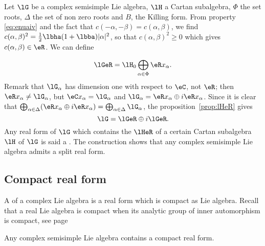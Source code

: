Let $\lG$ be a complex semisimple Lie algebra, $\lH$ a Cartan subalgebra, $\Phi$ the set roots, $\Delta$ the set of non zero roots and $B$, the Killing form. From property \eqref{eq:enuaiv} and the fact that $c(-\alpha,-\beta)=c(\alpha,\beta)$, we find $c(\alpha,\beta)^2=\frac{1}{2}\lbha(1+\lbba)|\alpha|^2$,
 so that $c(\alpha,\beta)^2\geq 0$ which gives $c(\alpha,\beta)\in\eR$. We can define

\[
   \lGeR=\lH_0\bigoplus_{\alpha\in\Phi}\eR x_{\alpha}.
\]
Remark that $\lG_{\alpha}$ has dimension one with respect to $\eC$, not $\eR$; then $\eR x_{\alpha}\neq\lG_{\alpha}$, but $\eC x_{\alpha}=\lG_{\alpha}$ and $\lG_{\alpha}=\eR x_{\alpha}\oplus i\eR x_{\alpha}$. Since it is clear that $\bigoplus_{\alpha\in\Delta}( \eR x_{\alpha}\oplus i\eR x_{\alpha} )=\bigoplus_{\alpha\in\Delta}\lG_{\alpha}$, the proposition~\ref{prop:lHeR} gives
\begin{equation}
  \lG=\lGeR\oplus i\lGeR.
\end{equation}
Any real form of $\lG$ which contains the $\lHeR$ of a certain Cartan subalgebra $\lH$ of $\lG$ is said a . The construction shows that any complex semisimple Lie algebra admits a split real form.

\subsection{Compact real form}

A  of a complex Lie algebra is a real form which is compact as Lie algebra. Recall that a real Lie algebra is compact when its analytic group of inner automorphism is compact, see page \pageref{pg:compact_Lie}

\begin{theorem}
Any complex semisimple Lie algebra contains a compact real form.
\end{theorem}

